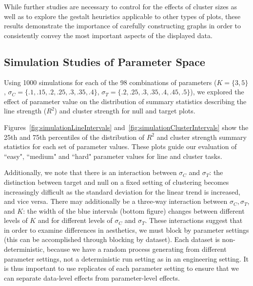 \documentclass[12pt]{article}\usepackage[]{graphicx}\usepackage[]{color}
\begin{document}
While further studies are necessary to control for the effects of cluster sizes as well as to explore the gestalt heuristics applicable to other types of plots, these results demonstrate the importance of carefully constructing graphs in order to consistently convey the most important aspects of the displayed data. 




\newpage
\begin{appendix}
\section{Simulation Studies of Parameter Space}\label{app:parametersimulation}

Using 1000 simulations for each of the 98 combinations of parameters ($K=\{3,5\}$, $\sigma_C=\{.1, .15, .2, .25, .3, .35, .4\}$, $\sigma_T=\{.2, .25, .3, .35, .4, .45, .5\}$), we explored the effect of parameter value on the distribution of summary statistics describing the line strength ($R^2$) and cluster strength for null and target plots. 

Figures~\ref{fig:simulationLineIntervals} and~\ref{fig:simulationClusterIntervals} show the 25th and 75th percentiles of the distribution of $R^2$ and cluster strength summary statistics for each set of parameter values. These plots guide our evaluation of ``easy", ``medium" and ``hard" parameter values for line and cluster tasks. 

Additionally, we note that there is an interaction between $\sigma_C$ and $\sigma_T$: the distinction between target and null on a fixed setting of clustering becomes increasingly difficult as the standard deviation for the linear trend is increased, and vice versa. There may additionally be a three-way interaction between $\sigma_C, \sigma_T$, and $K$: the width of the blue intervals (bottom figure) changes  between different levels of $K$ and for different levels of $\sigma_C$ and $\sigma_T$. These interactions suggest that in order to examine differences in aesthetics, we must block by parameter settings (this can be accomplished through blocking by dataset). Each dataset is non-deterministic, because we have a random process generating from different parameter settings, not a deterministic run setting as in an engineering setting. It is thus important to use replicates of each parameter setting to ensure that we can separate data-level effects from parameter-level effects. 




\end{appendix}
\end{document}
